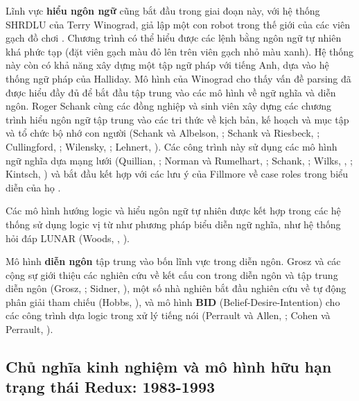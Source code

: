 Lĩnh vực \textbf{hiểu ngôn ngữ} cũng bắt đầu trong giai đoạn này, với hệ thống SHRDLU của Terry Winograd, giả lập một con robot trong thế giới của các viên gạch đồ chơi \citep{winograd1972understanding}. Chương trình có thể hiểu được các lệnh bằng ngôn ngữ tự nhiên khá phức tạp (đặt viên gạch màu đỏ lên trên viên gạch nhỏ màu xanh). Hệ thống này còn có khả năng xây dựng một tập ngữ pháp với tiếng Anh, dựa vào hệ thống ngữ pháp của Halliday. Mô hình của Winograd cho thấy vấn đề parsing đã được hiểu đầy đủ để bắt đầu tập trung vào các mô hình về ngữ nghĩa và diễn ngôn. Roger Schank cùng các đồng nghiệp và sinh viên xây dựng các chương trình hiểu ngôn ngữ tập trung vào các tri thức về kịch bản, kế hoạch và mục tập và tổ chức bộ nhớ con người (Schank và Albelson, \citeyear{schank1977}; Schank và Riesbeck, \citeyear{carbonell1981inside}; Cullingford, \citeyear{riesbeck1981inside}; Wilensky, \citeyear{wilensky1983planning}; Lehnert, \citeyear{lehnert1977conceptual}). Các công trình này sử dụng các mô hình ngữ nghĩa dựa mạng lưới (Quillian, \citeyear{quillianm.r1968}; Norman và Rumelhart, \citeyear{normand.arumerlhartd.e.1975}; Schank, \citeyear{schank1972conceptual}; Wilks, \citeyear{wilks1975preferential}, \citeyear{wilksy1975}; Kintsch, \citeyear{kintsch1974representation}) và bắt đầu kết hợp với các lưu ý của Fillmore về case roles \citep{fillmore1968lexical} trong biểu diễn của họ \citep{simmons1972semantic}.

Các mô hình hướng logic và hiểu ngôn ngữ tự nhiên được kết hợp trong các hệ thống sử dụng logic vị từ như phương pháp biểu diễn ngữ nghĩa, như hệ thống hỏi đáp LUNAR (Woods, \citeyear{Woods1967SemanticsFA}, \citeyear{Woods:1973:PNL:1499586.1499695}).

Mô hình \textbf{diễn ngôn} tập trung vào bốn lĩnh vực trong diễn ngôn. Grosz và các cộng sự giới thiệu các nghiên cứu về kết cấu con trong diễn ngôn và tập trung diễn ngôn (Grosz, \citeyear{grosz1977representation}; Sidner, \citeyear{10000030796}), một số nhà nghiên bắt đầu nghiên cứu về tự động phân giải tham chiếu (Hobbs, \citeyear{hobbs-resolving-1987}), và mô hình \textbf{BID} (Belief-Desire-Intention) cho các công trình dựa logic trong xử lý tiếng nói (Perrault và Allen, \citeyear{perrault1980plan}; Cohen và Perrault, \citeyear{COHEN1979177}).

\subsection{Chủ nghĩa kinh nghiệm và mô hình hữu hạn trạng thái Redux: 1983-1993}

